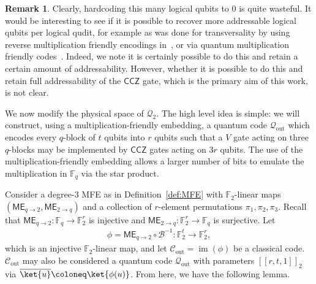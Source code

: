\documentclass[11pt]{article}
\theoremstyle{definition}
\newtheorem{remark}[theorem]{Remark}
\newcommand{\CCZ}{\mathsf{CCZ}}
\newcommand{\qcode}{\mathcal{Q}}
\newcommand{\qoutcode}{\mathcal{Q}_{\text{out}}}
\newcommand{\coutcode}{\mathcal{C}_{\text{out}}}
\newcommand{\enc}{\phi}
\newcommand{\FF}{\mathbb{F}}
\DeclareMathOperator{\im}{im}
\newcommand{\B}{\mathcal{B}}
\newcommand{\ME}{\mathsf{ME}_{q\rightarrow 2}}
\newcommand{\MEinv}{\mathsf{ME}_{2 \rightarrow q}}
\begin{document}
\begin{remark}
    Clearly, hardcoding this many logical qubits to $0$ is quite wasteful. It would be interesting to see if it is possible to recover more addressable logical qubits per logical qudit, for example as was done for transversality by using reverse multiplication friendly encodings in~\cite{nguyen2024goodbinaryquantumcodes}, or via quantum multiplication friendly codes~\cite{golowich2024asymptoticallygoodquantumcodes}. Indeed, we note it is certainly possible to do this and retain a certain amount of addressability. However, whether it is possible to do this and retain full addressability of the $\CCZ$ gate, which is the primary aim of this work, is not clear.
\end{remark}

We now modify the physical space of $\qcode_2$. 
The high level idea is simple: we will construct, using a multiplication-friendly embedding, a quantum code $\qoutcode$ which encodes every $q$-block of $t$ qubits into $r$ qubits such that a $V$ gate acting on three $q$-blocks may be implemented by $\CCZ$ gates acting on $3r$ qubits. The use of the multiplication-friendly embedding allows a larger number of bits to emulate the multiplication in $\mathbb{F}_q$ via the star product.

Consider a degree-3 MFE as in Definition~\ref{def:MFE} with $\FF_2$-linear maps $(\ME, \MEinv)$ and a collection of $r$-element permutations $\pi_1, \pi_2, \pi_3$.
Recall that $\ME: \FF_q\rightarrow \FF_2^r$ is injective and $\MEinv: \FF_2^r\rightarrow \FF_q$ is surjective.
Let
\begin{align}\label{eq:def_of_enc}
    \enc = \ME\circ \B^{-1}: \FF_2^t\rightarrow \FF_2^r,
\end{align}
which is an injective $\FF_2$-linear map, and let $\coutcode = \im(\enc)$ be a classical code.
$\coutcode$ may also be considered a quantum code $\qoutcode$ with parameters $[[r,t,1]]_2$ via $\overline{\ket{u}}\coloneq\ket{\phi(u)}$. From here, we have the following lemma.
\end{document}
